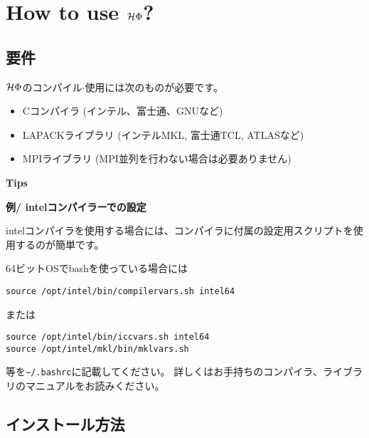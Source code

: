 \chapter{How to use $\mathcal{H} \Phi$?}
\label{Ch:HowTo}

\section{要件}

$\mathcal{H} \Phi$のコンパイル$\cdot$使用には次のものが必要です。
\begin{itemize}
\item Cコンパイラ (インテル、富士通、GNUなど)
\item LAPACKライブラリ (インテルMKL, 富士通TCL, ATLASなど)
\item MPIライブラリ (MPI並列を行わない場合は必要ありません)
\end{itemize}

\begin{screen}
\Large 
{\bf Tips}
\normalsize

{\bf 例/ intelコンパイラーでの設定}

intelコンパイラを使用する場合には、コンパイラに付属の設定用スクリプトを使用するのが簡単です。

64ビットOSでbashを使っている場合には
\begin{verbatim}
source /opt/intel/bin/compilervars.sh intel64
\end{verbatim}
または
\begin{verbatim}
source /opt/intel/bin/iccvars.sh intel64
source /opt/intel/mkl/bin/mklvars.sh
\end{verbatim}
等を\verb|~/.bashrc|に記載してください。
詳しくはお手持ちのコンパイラ、ライブラリのマニュアルをお読みください。

\end{screen}


\section{インストール方法}

\label{Sec:HowToInstall}
